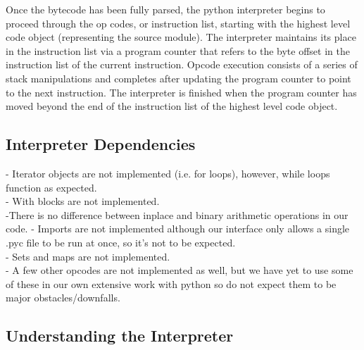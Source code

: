 \documentclass{article}
\begin{document}
Once the bytecode has been fully parsed, the python interpreter begins to proceed through the op codes, or instruction list, starting with the highest level code object (representing the source module).  The interpreter maintains its place in the instruction list via a program counter that refers to the byte offset in the instruction list of the current instruction.  Opcode execution consists of a series of stack manipulations and completes after updating the program counter to point to the next instruction. The interpreter is finished when the program counter has moved beyond the end of the instruction list of the highest level code object.

\subsection{Interpreter Dependencies}

- Iterator objects are not implemented (i.e. for loops), however, while loops function as expected.\\
- With blocks are not implemented.\\
-There is no difference between inplace and binary arithmetic operations in our code. 
- Imports are not implemented although our interface only allows a single .pyc file to be run at once, so it's not to be expected.\\
- Sets and maps are not implemented.\\
- A few other opcodes are not implemented as well, but we have yet to use some of these in our own extensive work with python so do not expect them to be major obstacles/downfalls.

\subsection{Understanding the Interpreter}
\end{document}
